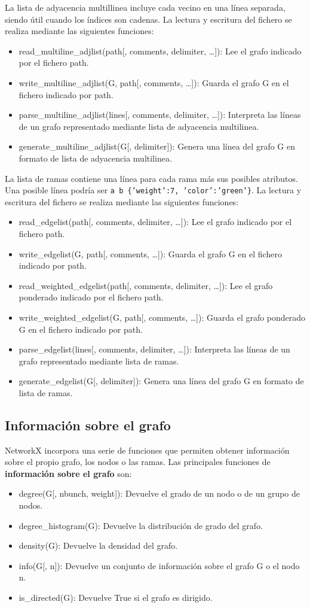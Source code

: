 La lista de adyacencia multillinea incluye cada vecino en una línea separada, siendo útil cuando los índices son cadenas. La lectura y escritura del fichero se realiza mediante las siguientes funciones:
\begin{itemize}
\item read\_multiline\_adjlist(path[, comments, delimiter, …]): Lee el grafo indicado por el fichero path.
\item write\_multiline\_adjlist(G, path[, comments, …]): Guarda el grafo G en el fichero indicado por path.
\item parse\_multiline\_adjlist(lines[, comments, delimiter, …]): Interpreta las líneas de un grafo representado mediante lista de adyacencia multilinea.
\item generate\_multiline\_adjlist(G[, delimiter]): Genera una línea del grafo G en formato de lista de adyacencia multilinea.
\end{itemize}

La lista de ramas contiene una línea para cada rama más sus posibles atributos. Una posible línea podría ser \texttt{a b \{'weight':7, 'color':'green'\}}.  La lectura y escritura del fichero se realiza mediante las siguientes funciones:
\begin{itemize}
\item read\_edgelist(path[, comments, delimiter, …]): Lee el grafo indicado por el fichero path.
\item write\_edgelist(G, path[, comments, …]): Guarda el grafo G en el fichero indicado por path.
\item read\_weighted\_edgelist(path[, comments, delimiter, …]): Lee el grafo ponderado indicado por el fichero path.
\item write\_weighted\_edgelist(G, path[, comments, …]): Guarda el grafo ponderado G en el fichero indicado por path.
\item parse\_edgelist(lines[, comments, delimiter, …]): Interpreta las líneas de un grafo representado mediante lista de ramas.
\item generate\_edgelist(G[, delimiter]): Genera una línea del grafo G en formato de lista de ramas.
\end{itemize}

\subsection{Información sobre el grafo}
NetworkX incorpora una serie de funciones que permiten obtener información sobre el propio grafo, los nodos o las ramas. Las principales funciones de \textbf{información sobre el grafo} son:
\begin{itemize}
\item degree(G[, nbunch, weight]): Devuelve el grado de un nodo o de un grupo de nodos.
\item degree\_histogram(G): Devuelve la distribución de grado del grafo.
\item density(G): Devuelve la densidad del grafo.
\item info(G[, n]): Devuelve un conjunto de información sobre el grafo G o el nodo n.
\item is\_directed(G): Devuelve True si el grafo es dirigido.
\end{itemize}

